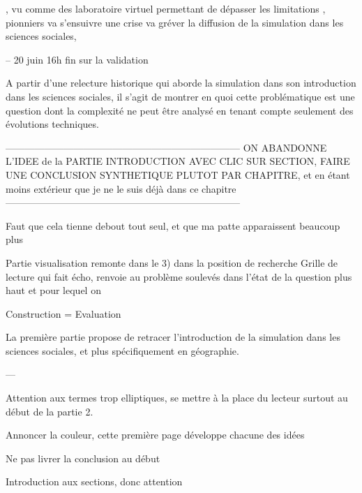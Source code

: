 ,  vu comme des laboratoire virtuel permettant de dépasser les limitations  ,  pionniers va s'ensuivre une crise va gréver la diffusion de la simulation dans les sciences sociales, 

--
20 juin 16h fin sur la validation 


A partir d'une relecture historique qui aborde la simulation dans son introduction dans les sciences sociales, il s'agit de montrer en quoi cette problématique est une question dont la complexité ne peut être analysé en tenant compte seulement des évolutions techniques.	

------------------------------------------------------------------------
ON ABANDONNE L'IDEE de la PARTIE INTRODUCTION AVEC CLIC SUR SECTION, FAIRE UNE CONCLUSION SYNTHETIQUE PLUTOT PAR CHAPITRE, et en étant moins extérieur que je ne le suis déjà dans ce chapitre
------------------------------------------------------------------------



Faut que cela tienne debout tout seul, et que ma patte apparaissent beaucoup plus 

Partie visualisation remonte dans le 3) dans la position de recherche
Grille de lecture qui fait écho, renvoie au problème soulevés dans l'état de la question plus haut et pour lequel on 






Construction = Evaluation

La première partie propose de retracer l'introduction de la simulation dans les sciences sociales, et plus spécifiquement en géographie. 




---

Attention aux termes trop elliptiques, se mettre à la place du lecteur surtout au début de la partie 2.

Annoncer la couleur, cette première page développe chacune des idées 


Ne pas livrer la conclusion au début 

Introduction aux sections, donc attention 



\printbibliography[heading=subbibliography]

\stopcontents[chapters]
